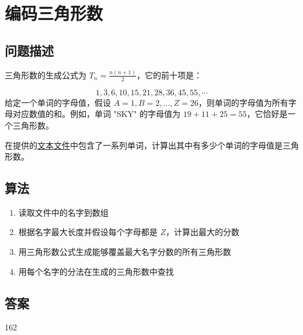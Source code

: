 \section{编码三角形数}\label{sec:problem42}
\subsection{问题描述}
\begin{tcolorbox}
	三角形数的生成公式为 $T_n = \frac{n(n+1)}{2}$，它的前十项是：

	\begin{equation*}
		1 , 3 , 6 , 10 , 15 , 21 , 28 , 36 , 45 , 55 , \cdots
	\end{equation*}
	给定一个单词的字母值，假设 $A=1, B=2, ..., Z=26$，则单词的字母值为所有字母对应数值的和。例如，单词 "SKY" 的字母值为
	$19 + 11 + 25 = 55$，它恰好是一个三角形数。

	在提供的\href{https://projecteuler.net/resources/documents/0042_words.txt}{文本文件}中包含了一系列单词，计算出其中有多少个单词的字母值是三角形数。
\end{tcolorbox}
\subsection{算法}
\begin{enumerate}
	\item 读取文件中的名字到数组
	\item 根据名字最大长度并假设每个字母都是 $Z$，计算出最大的分数
	\item 用三角形数公式生成能够覆盖最大名字分数的所有三角形数
	\item 用每个名字的分法在生成的三角形数中查找
\end{enumerate}

\subsection{答案}
162
